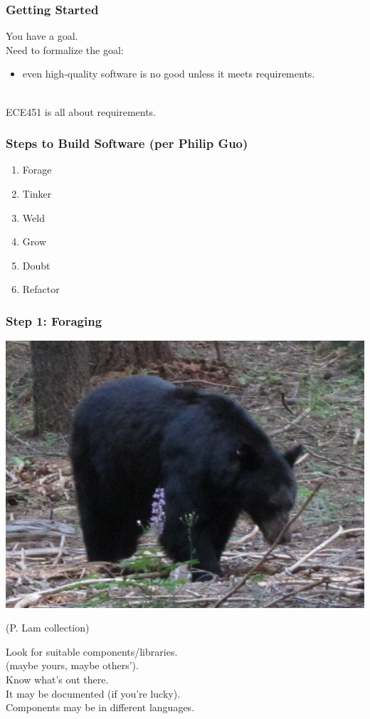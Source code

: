\begin{frame}
\frametitle{Getting Started}

\begin{changemargin}{1cm}
\Large
You have a goal.\\[1em]

Need to formalize the goal:
\begin{itemize}
\item even high-quality software is no good unless it meets requirements.
\end{itemize}
~\\[1em]
ECE451 is all about requirements.
\end{changemargin}

\end{frame}

\begin{frame}
\frametitle{Steps to Build Software (per Philip Guo)}

\begin{changemargin}{1cm}
\Huge
\begin{enumerate}
\item Forage
\item Tinker
\item Weld
\item Grow
\item Doubt
\item Refactor
\end{enumerate}
\end{changemargin}

\end{frame}

\begin{frame}

\frametitle{Step 1: Foraging}

\begin{center}
\includegraphics[width=.4\textwidth]{images/0673_foraging}
\end{center}
{\tiny \hfill (P. Lam collection)}

\begin{changemargin}{1cm}
Look for suitable components/libraries.\\
\qquad (maybe yours, maybe others').\\
\qquad Know what's out there.\\[1em]

It may be documented (if you're lucky).\\[1em]

Components may be in different languages.

\end{changemargin}

\end{frame}

